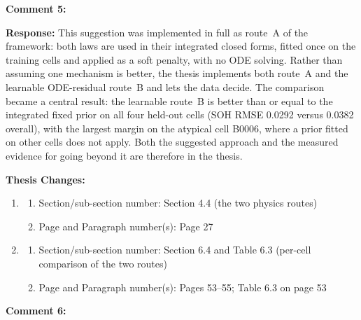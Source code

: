 \documentclass[12pt,a4paper]{article}
\begin{document}
\vspace{\baselineskip}

\textbf{Comment 5:} 

\vspace{\baselineskip}

\textbf{Response:} This suggestion was implemented in full as route~A of the
framework: both laws are used in their integrated closed forms, fitted once on
the training cells and applied as a soft penalty, with no ODE solving. Rather
than assuming one mechanism is better, the thesis implements both route~A and
the learnable ODE-residual route~B and lets the data decide. The comparison
became a central result: the learnable route~B is better than or equal to the
integrated fixed prior on all four held-out cells (SOH RMSE 0.0292 versus
0.0382 overall), with the largest margin on the atypical cell B0006, where a
prior fitted on other cells does not apply. Both the suggested approach and the
measured evidence for going beyond it are therefore in the thesis.

\vspace{\baselineskip}

\textbf{Thesis Changes:}

\begin{enumerate}
    \item
    \begin{enumerate}
        \item Section/sub-section number: Section 4.4 (the two physics routes)
        \item Page and Paragraph number(s): Page 27
    \end{enumerate}
    \item
    \begin{enumerate}
        \item Section/sub-section number: Section 6.4 and Table 6.3 (per-cell comparison of the two routes)
        \item Page and Paragraph number(s): Pages 53--55; Table 6.3 on page 53
    \end{enumerate}
\end{enumerate}

\vspace{\baselineskip}

\textbf{Comment 6:} 
\end{document}
